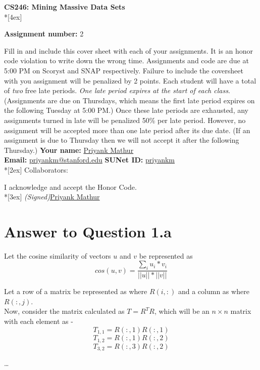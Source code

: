 \documentclass[11pt]{article}
\begin{document}
\thispagestyle{empty}
\parindent 0pt
\vfill
\large

\begin{center}
\LARGE{\bf \textsf{CS246: Mining Massive Data Sets}} \\*[4ex]
\end{center}

{\Large
\textbf{Assignment number:} 2
\vfill
\vfill

Fill in and include this cover sheet with each of your assignments. It is an honor code
violation to write down the wrong time. Assignments and code are due at 5:00 PM on Scoryst and SNAP respectively. Failure to include the coversheet with you assignment will
be penalized by 2 points.
Each student will have a total of \textit{two} free late periods. \textit{One late period expires at the start of
each class}. (Assignments are due on Thursdays, which means the first late period expires on
the following Tuesday at 5:00 PM.) Once these late periods are exhausted, any assignments
turned in late will be penalized 50\% per late period. However, no assignment will be accepted
more than one late period after its due date. (If an assignment is due to Thursday then we
will not accept it after the following Thursday.)
\vfill
\vfill
{\Large
\textbf{Your name:} \underline{Priyank Mathur} \\
\textbf{Email:} \underline{priyankm@stanford.edu} \textbf{SUNet ID:} \underline{priyankm}\\*[2ex] }
Collaborators: \hrulefill \\
\vfill

\vfill

I acknowledge and accept the Honor Code.\\*[3ex]
\bigskip
\textit{(Signed)}\underline{Priyank Mathur}

\vfill
\vfill

\pagebreak[4]
\section*{Answer to Question 1.a}

Let the cosine similarity of vectors $u$ and $v$ be represented as 
$$ cos(u, v) = \frac{ \sum_{i} u_i * v_i }{||u|| * ||v||} $$

Let a row of a matrix be represented as where $R(i, :)$ and a column as where $R(:, j)$.\\

Now, consider the matrix calculated as $T = R^TR$, which will be an $n \times n$ matrix with each element as -
$$T_{1,1} = R(:, 1) R(:, 1)$$
$$T_{1,2} = R(:, 1) R(:, 2)$$
$$T_{3,2} = R(:, 3) R(:, 2)$$
\begin{center} {\dots} \end{center}

}
\end{document}
